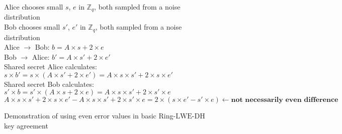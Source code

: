 \begin{figure}[H]
    \centering
	Alice chooses {small} $s$, $e$ in ${\mathbb{Z}}_{q}$, both sampled from a noise distribution\\
	Bob chooses {small} $s'$, $e'$ in ${\mathbb{Z}}_{q}$, both sampled from a noise distribution\\
	Alice $\to$ Bob: $b = A \times s + 2 \times e$\\
	Bob $\to$ Alice: $b' = A \times s' + 2 \times e'$\\
	Shared secret Alice calculates: $s \times b' = s \times (A \times s' + 2 \times e') = A \times s   \times s' + 2\times s \times e'$\\
	Shared secret Bob calculates: $s' \times b = s' \times (A \times s + 2 \times e) = A \times s   \times s' + 2 \times s' \times e$
	$A \times s   \times s' + 2\times s \times e' - A \times s   \times s' + 2 \times s' \times e = 2 \times (s\times e' - s' \times e)\leftarrow \textbf{not necessarily even difference}$
	\caption{Demonstration of using even error values in basic Ring-$\mathrm{LWE\text{-}DH}$ key agreement}
\end{figure}


